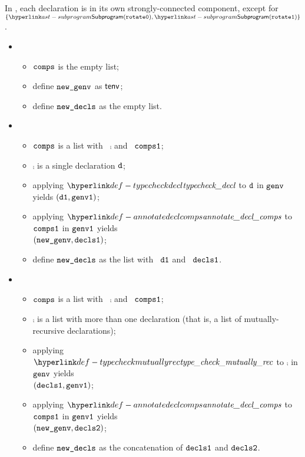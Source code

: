 In ,
each declaration is in its own strongly-connected component,
except for $\{ \Subprogram(\rotatezero), \Subprogram(\rotateone) \}$.

\ProseParagraph
\OneApplies
\begin{itemize}
  \item {}
  \begin{itemize}
    \item $\texttt{comps}$ is the empty list;
    \item define $\texttt{new\_genv}$ as $\textsf{tenv}$;
    \item define $\texttt{new\_decls}$ as the empty list.
  \end{itemize}

  \item {}
  \begin{itemize}
    \item $\texttt{comps}$ is a list with \head\ $\comp$ and \tail\ $\texttt{comps1}$;
    \item $\comp$ is a single declaration $\texttt{d}$;
    \item applying $\typecheckdecl$ to $\texttt{d}$ in $\texttt{genv}$ yields $(\texttt{d1}, \texttt{genv1})$\ProseOrTypeError;
    \item applying $\annotatedeclcomps$ to $\texttt{comps1}$ in $\texttt{genv1}$ yields \\ $(\texttt{new\_genv}, \texttt{decls1})$\ProseOrTypeError;
    \item define $\texttt{new\_decls}$ as the list with \head\ $\texttt{d1}$ and \tail\ $\texttt{decls1}$.
  \end{itemize}

  \item {}
  \begin{itemize}
    \item $\texttt{comps}$ is a list with \head\ $\comp$ and \tail\ $\texttt{comps1}$;
    \item $\comp$ is a list with more than one declaration (that is, a list of mutually-recursive declarations);
    \item applying $\typecheckmutuallyrec$ to $\comp$ in $\texttt{genv}$ yields \\ $(\texttt{decls1}, \texttt{genv1})$\ProseOrTypeError;
    \item applying $\annotatedeclcomps$ to $\texttt{comps1}$ in $\texttt{genv1}$ yields \\ $(\texttt{new\_genv}, \texttt{decls2})$\ProseOrTypeError;
    \item define $\texttt{new\_decls}$ as the concatenation of $\texttt{decls1}$ and $\texttt{decls2}$.
  \end{itemize}
\end{itemize}

